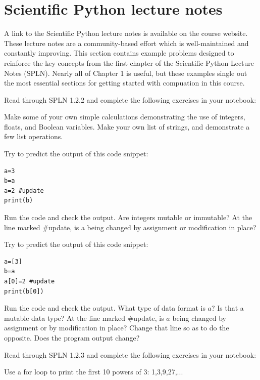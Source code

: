 \section{Scientific Python lecture notes}

A link to the Scientific Python lecture notes is available on the
course website.  These lecture notes are a community-based effort
which is well-maintained and constantly improving.  This section
contains example problems designed to reinforce the key concepts from
the first chapter of the Scientific Python Lecture Notes (SPLN).
Nearly all of Chapter 1 is useful, but these examples single out the
most essential sections for getting started with compuation in this
course.

Read through SPLN 1.2.2 and complete the following exercises in your notebook:

\begin{plot}
  Make some of your own simple calculations demonstrating the use of
  integers, floats, and Boolean variables.  Make your own list of
  strings, and demonstrate a few list operations.
\end{plot}

\begin{plot}
\begin{samepage}  
Try to predict the output of this code snippet:
\begin{verbatim}
a=3
b=a
a=2 #update
print(b)
\end{verbatim}
\end{samepage}
Run the code and check the output.  Are integers mutable or immutable?
At the line marked \#update, is a being changed by assignment or modification in place?
\end{plot}

\begin{plot}
Try to predict the output of this code snippet:
\begin{verbatim}
a=[3]
b=a
a[0]=2 #update
print(b[0])
\end{verbatim}
Run the code and check the output.  What type of data format is $a$?
Is that a mutable data type?  At the line marked \#update, is $a$
being changed by assignment or by modification in place?  Change that
line so as to do the opposite.  Does the program output change?
\end{plot}

Read through SPLN 1.2.3 and complete the following exercises in your notebook:

\begin{plot}
Use a for loop to print the first 10 powers of 3:  1,3,9,27,...
\end{plot}

